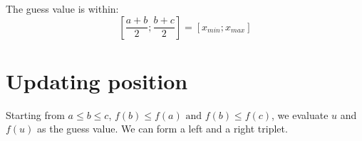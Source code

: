 \documentclass[aps,12pt]{revtex4}
\begin{document}
The guess value is within:
$$
	\left[ \dfrac{a+b}{2}; \dfrac{b+c}{2}\right] = \left[ x_{min} ; x_{max} \right]
$$

\section{Updating position}

Starting from $a\leq b \leq c$, $f(b)\leq f(a) \text{ and } f(b)\leq f(c)$,
we evaluate $u$ and $f(u)$ as the guess value.
We can form a left and a right triplet.
\end{document}
